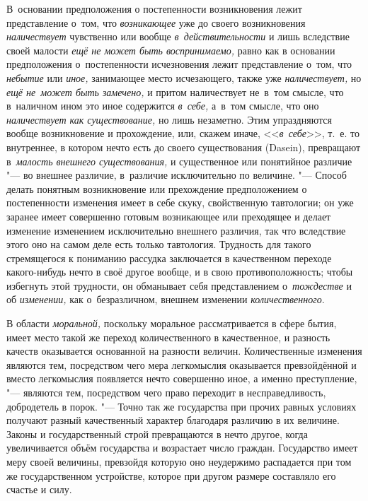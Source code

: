 В~основании предположения о постепенности возникновения лежит представление
о~том, что {\em возникающее} уже до своего возникновения {\em наличествует}
чувственно или вообще {\em в~действительности} и лишь вследствие своей малости
{\em ещё не может быть воспринимаемо,} равно как в основании предположения
о~постепенности исчезновения лежит представление о~том, что {\em небытие} или
{\em иное,} занимающее место исчезающего, также уже
{\em наличествует,} но {\em ещё не~может быть замечено,} и притом наличествует
не~в~том смысле, что в~наличном ином это иное содержится {\em в~себе,}
а~в~том смысле, что оно {\em наличествует как существование,} но лишь
незаметно. Этим упраздняются вообще возникновение и прохождение, или, скажем
иначе, <<{\em в~себе}>>, т.~е. то внутреннее, в котором нечто есть до своего
существования (Dasein), превращают в~{\em малость внешнего существования,} и
существенное или понятийное различие "--- во внешнее различие, в~различие
исключительно по величине. "--- Способ делать понятным возникновение или
прехождение предположением о постепенности изменения имеет в себе скуку,
свойственную тавтологии; он уже заранее имеет совершенно готовым возникающее
или преходящее и делает изменение изменением исключительно внешнего различия,
так что вследствие этого оно на самом деле есть только тавтология. Трудность
для такого стремящегося к пониманию рассудка заключается в качественном
переходе какого-нибудь нечто в своё другое вообще, и в свою противоположность;
чтобы избегнуть этой трудности, он обманывает себя представлением
о~{\em тождестве} и об {\em изменении,} как о~безразличном,
внешнем изменении {\em количественного}.

В области {\em моральной,} поскольку моральное рассматривается в сфере бытия,
имеет место такой же переход количественного в качественное, и разность качеств
оказывается основанной на разности величин. Количественные изменения являются
тем, посредством чего мера легкомыслия оказывается превзойдённой и вместо
легкомыслия появляется нечто совершенно иное, а именно преступление, "---
являются тем, посредством чего право переходит в несправедливость, добродетель
в порок. "--- Точно так же государства при прочих равных условиях получают
разный качественный характер благодаря различию в их величине. Законы и
государственный строй превращаются в нечто другое, когда увеличивается объём
государства и возрастает число граждан. Государство имеет меру своей величины,
превзойдя которую оно неудержимо распадается при том же государственном
устройстве, которое при другом размере составляло его счастье и силу.

